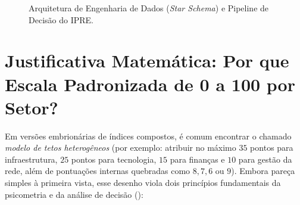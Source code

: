 \documentclass[9pt,a4paper]{extarticle}
\begin{document}
\begin{figure}[htbp]
\caption{Arquitetura de Engenharia de Dados (\emph{Star Schema}) e Pipeline de Decisão do IPRE.}
\label{fig:pipeline_star_schema}
\end{figure}

\section{Justificativa Matemática: Por que Escala Padronizada de 0 a 100 por Setor?}

Em versões embrionárias de índices compostos, é comum encontrar o chamado \emph{modelo de tetos heterogêneos} (por exemplo: atribuir no máximo $35$ pontos para infraestrutura, $25$ pontos para tecnologia, $15$ para finanças e $10$ para gestão da rede, além de pontuações internas quebradas como $8, 7, 6$ ou $9$). Embora pareça simples à primeira vista, esse desenho viola dois princípios fundamentais da psicometria e da análise de decisão (\cite{nardo2005, oecd2008}):
\end{document}
